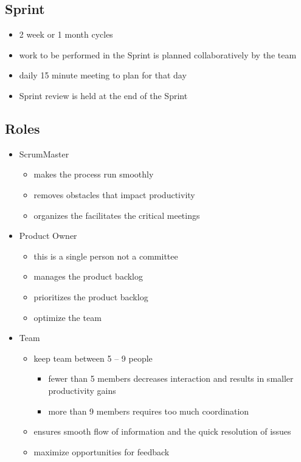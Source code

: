 \documentclass{article}
\begin{document}
\subsection{Sprint}
\begin{itemize}
  \item 2 week or 1 month cycles
  \item work to be performed in the Sprint is planned collaboratively by the
        team
  \item daily 15 minute meeting to plan for that day
  \item Sprint review is held at the end of the Sprint
\end{itemize}

\subsection{Roles}
\begin{itemize}
  \item ScrumMaster
    \begin{itemize}
      \item makes the process run smoothly
      \item removes obstacles that impact productivity
      \item organizes the facilitates the critical meetings
    \end{itemize}
  \item Product Owner
    \begin{itemize}
      \item this is a single person not a committee
      \item manages the product backlog
      \item prioritizes the product backlog
      \item optimize the team
    \end{itemize}
  \item Team
    \begin{itemize}
      \item keep team between 5 -- 9 people
        \begin{itemize}
          \item fewer than 5 members decreases interaction and results in
                smaller productivity gains
          \item more than 9 members requires too much coordination
        \end{itemize}
      \item ensures smooth flow of information and the quick resolution of
            issues
      \item maximize opportunities for feedback
    \end{itemize}
\end{itemize}

\end{document}
